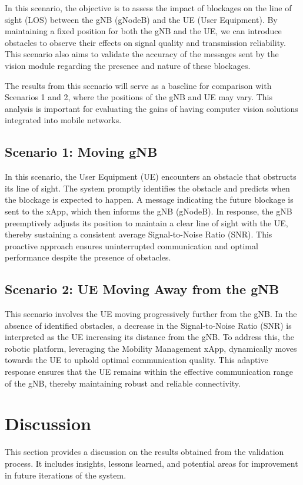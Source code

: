In this scenario, the objective is to assess the impact of blockages on the line of sight (LOS) between the gNB (gNodeB) and the UE (User Equipment).
By maintaining a fixed position for both the gNB and the UE, we can introduce obstacles to observe their effects on signal quality and transmission reliability.
This scenario also aims to validate the accuracy of the messages sent by the vision module regarding the presence and nature of these blockages.

The results from this scenario will serve as a baseline for comparison with Scenarios 1 and 2, where the positions of the gNB and UE may vary.
This analysis is important for evaluating the gains of having computer vision solutions integrated into mobile networks.

\subsection{Scenario 1: Moving gNB}
In this scenario, the User Equipment (UE) encounters an obstacle that obstructs its line of sight. %
The system promptly identifies the obstacle and predicts when the blockage is expected to happen.
A message indicating the future blockage is sent to the xApp, which then informs the gNB (gNodeB). In response, the gNB preemptively adjusts its position to maintain a clear line of sight with the UE, thereby sustaining a consistent average Signal-to-Noise Ratio (SNR). This proactive approach ensures uninterrupted communication and optimal performance despite the presence of obstacles.

\subsection{Scenario 2: UE Moving Away from the gNB}

This scenario involves the UE moving progressively further from the gNB. In the absence of identified obstacles, a decrease in the Signal-to-Noise Ratio (SNR) is interpreted as the UE increasing its distance from the gNB. To address this, the robotic platform, leveraging the Mobility Management xApp, dynamically moves towards the UE to uphold optimal communication quality. This adaptive response ensures that the UE remains within the effective communication range of the gNB, thereby maintaining robust and reliable connectivity.


\section{Discussion}\label{sec:discuss}
This section provides a discussion on the results obtained from the validation process.
It includes insights, lessons learned, and potential areas for improvement in future iterations of the system.
